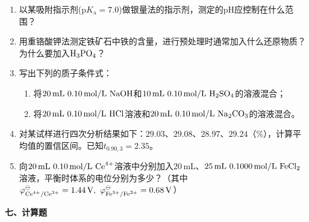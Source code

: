 \begin{enumerate}
    \item 以某吸附指示剂($\text{p}K_\text{a}=7.0$)做银量法的指示剂，测定的pH应控制在什么范围？
    \item 用重铬酸钾法测定铁矿石中铁的含量，进行预处理时通常加入什么还原物质？为什么要加入$\ce{H3PO4}$？
    \item 写出下列的质子条件式：
    \begin{enumerate}
        \item 将$20\,\mathrm{mL}\ 0.10\,\mathrm{mol/L}\ \ce{NaOH}$和$10\,\mathrm{mL}\ 0.10\,\mathrm{mol/L}\ \ce{H2SO4}$的溶液混合；
        \item 将$20\,\mathrm{mL}\ 0.10\,\mathrm{mol/L}\ \ce{HCl}$溶液和$20\,\mathrm{mL}\ 0.10\,\mathrm{mol/L}\ \ce{Na2CO3}$的溶液混合。
    \end{enumerate}
    \item 对某试样进行四次分析结果如下：$29.03$、$29.08$、$28.97$、$29.24$（\%），计算平均值的置信区间。已知$t_{0.90,3}=2.35$。
    \item 向$20\,\mathrm{mL}\ 0.10\,\mathrm{mol/L}\ \ce{Ce^{4+}}$溶液中分别加入$20\,\mathrm{mL}$、$25\,\mathrm{mL}\ 0.1000\,\mathrm{mol/L}\ \ce{FeCl2}$溶液，平衡时体系的电位分别为多少？（其中$\varphi^\ominus_{\ce{Ce^{4+}/Ce^{3+}}}=1.44\,\mathrm{V},\ \varphi^\ominus_{\ce{Fe^{3+}/Fe^{2+}}}=0.68\,\mathrm{V}$）
\end{enumerate}

\vspace{1em}
\noindent\textbf{七、计算题}

